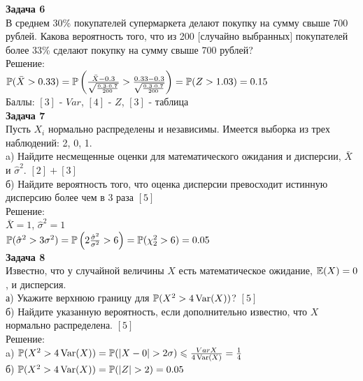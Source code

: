 \documentclass[12pt, a4paper]{article}\usepackage[]{graphicx}\usepackage[]{color}
\begin{document}
	\textbf{Задача 6} \\ %
	В среднем 30\% покупателей супермаркета делают покупку на сумму
	свыше 700 рублей. Какова вероятность того, что из 200 $[$случайно
	выбранных$]$ покупателей
	более 33\% сделают покупку на сумму свыше 700 рублей? \\
	Решение: \\
	$\P(\bar{X}>0.33)=\P\left(\frac{\bar{X}-0.3}{\sqrt{\frac{0.3\cdot
				0.7}{200}}}>\frac{0.33-0.3}{\sqrt{\frac{0.3\cdot
				0.7}{200}}}\right)=\P(Z>1.03)=0.15$ \\
	Баллы: $[3]$ - $Var$, $[4]$ - $Z$, $[3]$ - таблица \\


	\textbf{Задача 7} \\ %
	Пусть $X_{i}$ нормально распределены и
	независимы. Имеется выборка
	из трех наблюдений: 2, 0, 1. \\
	a) Найдите несмещенные оценки для математического ожидания и
	дисперсии, $\bar{X}$ и $\hat{\sigma}^{2}$. $[2]+[3]$\\
	б) Найдите вероятность того, что оценка дисперсии превосходит
	истинную дисперсию более чем в 3 раза $[5]$\\
	Решение: \\
	$\bar{X}=1$, $\hat{\sigma}^{2}=1$ \\
	$\P(\hat{\sigma}^{2}>3\sigma^{2})=\P\left(2\frac{\hat{\sigma}^{2}}{\sigma^{2}}>6\right)=\P(\chi_{2}^{2}>6)=0.05$
	\\


	\textbf{Задача 8} \\ %
	Известно, что у случайной величины $X$ есть
	математическое
	ожидание, $\E(X)=0$, и дисперсия. \\
	а) Укажите верхнюю границу для $\P(X^{2}>4\Var(X))$? $[5]$\\
	б) Найдите указанную вероятность, если дополнительно известно, что
	$X$ нормально распределена. $[5]$\\
	Решение: \\
	a) $\P(X^{2}>4\Var(X))=\P(|X-0|>2\sigma)\le
	\frac{Var{X}}{4\Var(X)}=\frac{1}{4}$ \\
	б) $\P(X^{2}>4\Var(X))=\P(|Z|>2)=0.05$ \\
\end{document}
